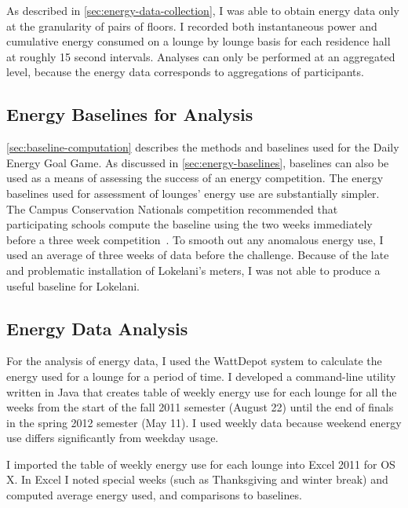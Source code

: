 As described in \autoref{sec:energy-data-collection}, I was able to obtain energy data only at the granularity of pairs of floors. I recorded both instantaneous power and cumulative energy consumed on a lounge by lounge basis for each residence hall at roughly 15 second intervals. Analyses can only be performed at an aggregated level, because the energy data corresponds to aggregations of participants. 


\subsection{Energy Baselines for Analysis}
\label{sec:baselines-for-analysis}

\autoref{sec:baseline-computation} describes the methods and baselines used for the Daily Energy Goal Game. As discussed in \autoref{sec:energy-baselines}, baselines can also be used as a means of assessing the success of an energy competition. The energy baselines used for assessment of lounges' energy use are substantially simpler. The Campus Conservation Nationals competition recommended that participating schools compute the baseline using the two weeks immediately before a three week competition~\cite{conservation-nationals-website}. To smooth out any anomalous energy use, I used an average of three weeks of data before the challenge. Because of the late and problematic installation of Lokelani's meters, I was not able to produce a useful baseline for Lokelani.


\subsection{Energy Data Analysis}

For the analysis of energy data, I used the WattDepot system to calculate the energy used for a lounge for a period of time. I developed a command-line utility written in Java that creates table of weekly energy use for each lounge for all the weeks from the start of the fall 2011 semester (August 22) until the end of finals in the spring 2012 semester (May 11). I used weekly data because weekend energy use differs significantly from weekday usage.

I imported the table of weekly energy use for each lounge into Excel 2011 for OS X. In Excel I noted special weeks (such as Thanksgiving and winter break) and computed average energy used, and comparisons to baselines.


